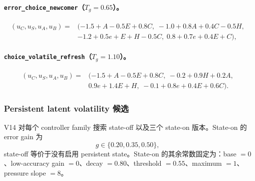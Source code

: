 \paragraph{\texttt{error\_choice\_newcomer}（$T_g=0.65$）。}
\begin{align}
    (u_C,u_S,u_A,u_B)
    ={}&
    (-1.5+A-0.5E+0.8C,\;
     -1.0+0.8A+0.4C-0.5H,\nonumber\\
    &-1.2+0.5e+E+H-0.5C,\;
     0.8+0.7e+0.4E+C),
    \label{eq:modelv14-family-choice}
\end{align}

\paragraph{\texttt{choice\_volatile\_refresh}（$T_g=1.10$）。}
\begin{align}
    (u_C,u_S,u_A,u_B)
    ={}&
    (-1.5+A-0.5E+0.8C,\;
     -0.2+0.9H+0.2A,\nonumber\\
    &0.9e+1.4E+H,\;
     -0.1+0.8e+0.4E+0.6C).
    \label{eq:modelv14-family-volatile}
\end{align}


\subsubsection{Persistent latent volatility 候选}

V14 对每个 controller family 搜索 state-off 以及三个 state-on 版本。State-on 的 error gain 为
\begin{equation}
    g\in\{0.20,0.35,0.50\},
    \label{eq:modelv14-state-gain}
\end{equation}
state-off 等价于没有启用 persistent state。State-on 的其余常数固定为：base $=0$、low-accuracy gain $=0$、decay $=0.80$、threshold $=0.55$、maximum $=1$、pressure slope $=8$。

